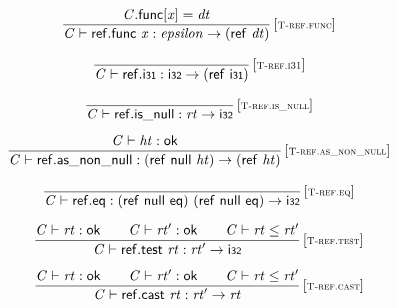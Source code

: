 $$
\begin{array}{@{}c@{}}\displaystyle
\frac{
{\mathit{C}}.\mathsf{func}[{\mathit{x}}] = {\mathit{dt}}
}{
{\mathit{C}} \vdash \mathsf{ref.func}~{\mathit{x}} : {\mathit{epsilon}} \rightarrow (\mathsf{ref}~{\mathit{dt}})
} \, {[\textsc{\scriptsize T{-}ref.func}]}
\qquad
\end{array}
$$

$$
\begin{array}{@{}c@{}}\displaystyle
\frac{
}{
{\mathit{C}} \vdash \mathsf{ref.i{\scriptstyle31}} : \mathsf{i{\scriptstyle32}} \rightarrow (\mathsf{ref}~\mathsf{i{\scriptstyle31}})
} \, {[\textsc{\scriptsize T{-}ref.i31}]}
\qquad
\end{array}
$$

$$
\begin{array}{@{}c@{}}\displaystyle
\frac{
}{
{\mathit{C}} \vdash \mathsf{ref.is\_null} : {\mathit{rt}} \rightarrow \mathsf{i{\scriptstyle32}}
} \, {[\textsc{\scriptsize T{-}ref.is\_null}]}
\qquad
\end{array}
$$

$$
\begin{array}{@{}c@{}}\displaystyle
\frac{
{\mathit{C}} \vdash {\mathit{ht}} : \mathsf{ok}
}{
{\mathit{C}} \vdash \mathsf{ref.as\_non\_null} : (\mathsf{ref}~\mathsf{null}~{\mathit{ht}}) \rightarrow (\mathsf{ref}~{\mathit{ht}})
} \, {[\textsc{\scriptsize T{-}ref.as\_non\_null}]}
\qquad
\end{array}
$$

$$
\begin{array}{@{}c@{}}\displaystyle
\frac{
}{
{\mathit{C}} \vdash \mathsf{ref.eq} : (\mathsf{ref}~\mathsf{null}~\mathsf{eq})~(\mathsf{ref}~\mathsf{null}~\mathsf{eq}) \rightarrow \mathsf{i{\scriptstyle32}}
} \, {[\textsc{\scriptsize T{-}ref.eq}]}
\qquad
\end{array}
$$

$$
\begin{array}{@{}c@{}}\displaystyle
\frac{
{\mathit{C}} \vdash {\mathit{rt}} : \mathsf{ok}
 \qquad
{\mathit{C}} \vdash {\mathit{rt}'} : \mathsf{ok}
 \qquad
{\mathit{C}} \vdash {\mathit{rt}} \leq {\mathit{rt}'}
}{
{\mathit{C}} \vdash \mathsf{ref.test}~{\mathit{rt}} : {\mathit{rt}'} \rightarrow \mathsf{i{\scriptstyle32}}
} \, {[\textsc{\scriptsize T{-}ref.test}]}
\qquad
\end{array}
$$

$$
\begin{array}{@{}c@{}}\displaystyle
\frac{
{\mathit{C}} \vdash {\mathit{rt}} : \mathsf{ok}
 \qquad
{\mathit{C}} \vdash {\mathit{rt}'} : \mathsf{ok}
 \qquad
{\mathit{C}} \vdash {\mathit{rt}} \leq {\mathit{rt}'}
}{
{\mathit{C}} \vdash \mathsf{ref.cast}~{\mathit{rt}} : {\mathit{rt}'} \rightarrow {\mathit{rt}}
} \, {[\textsc{\scriptsize T{-}ref.cast}]}
\qquad
\end{array}
$$

